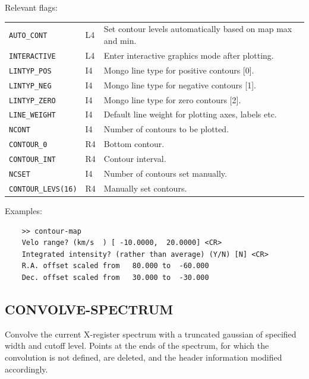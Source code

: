 \documentclass[11pt,twoside]{report}
\begin{document}
Relevant flags:\\
\begin{tabular}{lll}
 \verb+AUTO_CONT+    & L4 & \parbox[t]{4in}{Set contour levels automatically based on map max
                            and min.}\\
 \verb+INTERACTIVE+  & L4 & Enter interactive graphics mode after plotting.\\
 \verb+LINTYP_POS+   & I4 & Mongo line type for positive contours [0].\\
 \verb+LINTYP_NEG+   & I4 & Mongo line type for negative contours [1].\\
 \verb+LINTYP_ZERO+  & I4 & Mongo line type for zero contours [2].\\
 \verb+LINE_WEIGHT+  & I4 & Default line weight for plotting axes,
                            labels etc.\\
 \verb+NCONT+        & I4 & Number of contours to be plotted.\\
 \verb+CONTOUR_0+    & R4 & Bottom contour.\\
 \verb+CONTOUR_INT+  & R4 & Contour interval.\\
 \verb+NCSET+        & I4 & Number of contours set manually.\\
 \verb+CONTOUR_LEVS(16)+ & R4 & Manually set contours.
\end{tabular}

Examples:
\begin{verbatim}
    >> contour-map
    Velo range? (km/s  ) [ -10.0000,  20.0000] <CR>
    Integrated intensity? (rather than average) (Y/N) [N] <CR>
    R.A. offset scaled from   80.000 to  -60.000
    Dec. offset scaled from   30.000 to  -30.000
\end{verbatim}

\subsection{CONVOLVE-SPECTRUM} 

Convolve the current X-register spectrum with a truncated gaussian of
specified width and cutoff level. Points at the ends of the spectrum,
for which the convolution is not defined, are deleted, and the
header information modified accordingly.
\end{document}
